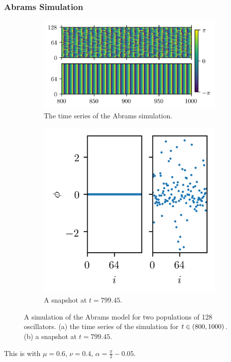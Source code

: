 \documentclass[hyperref={hidelinks}]{beamer}
\begin{document}
\begin{frame}
  \frametitle{Abrams Simulation}
  \begin{figure}[ht]
    \centering
    \begin{subfigure}{0.6\textwidth}
      \centering
      \includegraphics[width=\textwidth]{figure/abrams_overhead}
      \caption{The time series of the Abrams simulation.}
      \label{fig:abrams_overhead}
    \end{subfigure} %
    \begin{subfigure}{0.3\textwidth}
      \centering
      \includegraphics[width=\textwidth]{figure/abrams_snapshot}
      \caption{A snapshot at $t = 799.45$.}
      \label{fig:abrams_snapshot}
    \end{subfigure}
    \caption[Abrams simulation]{A simulation of the Abrams model for two populations of 128 oscillators.
      (a) the time series of the simulation for $t \in \pqty{800, 1000}$.
      (b) a snapshot at $t = 799.45$.
    }
    \label{fig:abrams}
  \end{figure}

  This is with $\mu = 0.6$, $\nu = 0.4$, $\alpha = \frac{\pi}{2} - 0.05$.

\end{frame}
\end{document}
